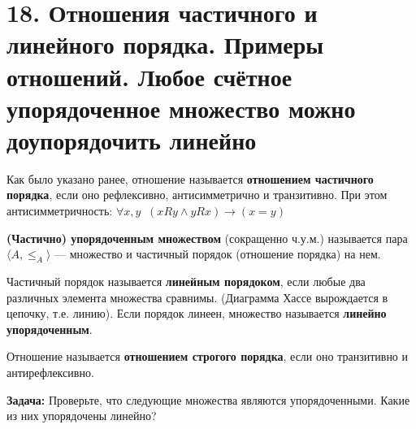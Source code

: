 \section*{18. Отношения частичного и линейного порядка. Примеры отношений. Любое счётное упорядоченное множество можно доупорядочить линейно }
\par Как было указано ранее, отношение называется \textbf{отношением частичного порядка}, если оно рефлексивно, антисимметрично и транзитивно. При этом антисимметричность:  $\forall x,y \;\; (xRy \land yRx) \to (x=y)$
\\ \par \textbf{(Частично) упорядоченным множеством} (сокращенно ч.у.м.) называется пара $\langle A,\leq_A \rangle$ — множество и частичный порядок (отношение порядка) на нем.
\par Частичный порядок называется \textbf{линейным порядоком}, если любые два различных элемента множества сравнимы. (Диаграмма Хассе вырождается в цепочку, т.е. линию). Если порядок линеен, множество называется \textbf{линейно упорядоченным}.
\par Отношение называется \textbf{отношением строгого порядка}, если оно транзитивно и антирефлексивно.
\\ \par \textbf{Задача:} Проверьте, что следующие множества являются упорядоченными. Какие из них упорядочены линейно?
